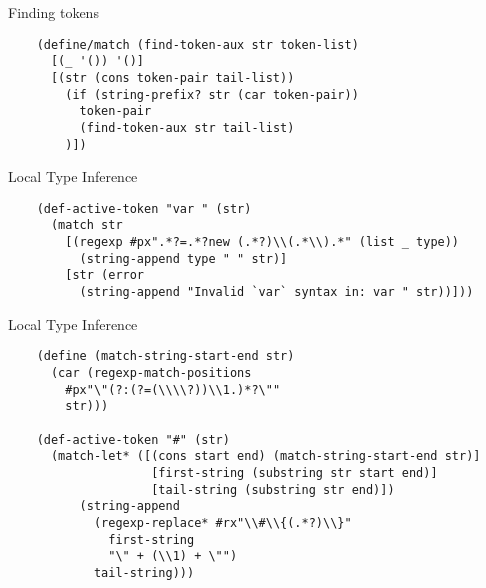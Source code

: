 \documentclass[13pt]{beamer}
\begin{document}
\begin{frame}[fragile]{Finding tokens}
  \begin{verbatim}
    (define/match (find-token-aux str token-list)
      [(_ '()) '()]
      [(str (cons token-pair tail-list))
        (if (string-prefix? str (car token-pair))
          token-pair
          (find-token-aux str tail-list)
        )])
 \end{verbatim}
\end{frame}


\begin{frame}[fragile]{Local Type Inference}
  \begin{verbatim}
    (def-active-token "var " (str) 
      (match str
        [(regexp #px".*?=.*?new (.*?)\\(.*\\).*" (list _ type))
          (string-append type " " str)]
        [str (error
          (string-append "Invalid `var` syntax in: var " str))]))
 \end{verbatim}
\end{frame}


\begin{frame}[fragile]{Local Type Inference}
  \begin{verbatim}
    (define (match-string-start-end str)
      (car (regexp-match-positions
        #px"\"(?:(?=(\\\\?))\\1.)*?\""
        str)))

    (def-active-token "#" (str)
      (match-let* ([(cons start end) (match-string-start-end str)]
                    [first-string (substring str start end)]
                    [tail-string (substring str end)])
          (string-append 
            (regexp-replace* #rx"\\#\\{(.*?)\\}"
              first-string
              "\" + (\\1) + \"")
            tail-string)))

 \end{verbatim}
\end{frame}
\end{document}

